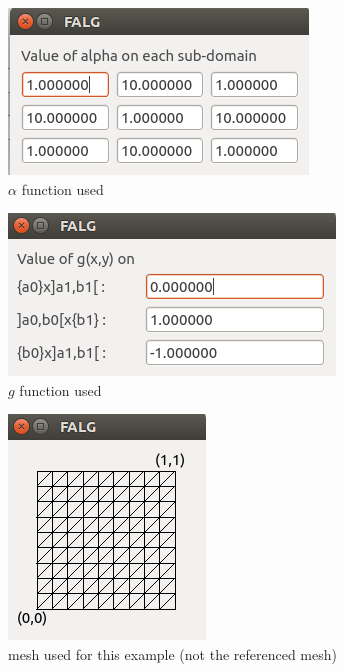 \documentclass[a4paper]{report}
\begin{document}
\begin{figure}[H]
\begin{center}
\includegraphics[scale=0.53]{reference_alpha.png}\caption{$\alpha$ function used}
\end{center}
\end{figure}


\begin{figure}[H]
\begin{center}
\includegraphics[scale=0.53]{reference_g.png}\caption{$g$ function used}
\end{center}
\end{figure}


\begin{figure}[H]
\begin{center}
\includegraphics[scale=0.63]{reference_mesh.png}\caption{mesh used for this example (not the referenced mesh)}
\end{center}
\end{figure}
\end{document}
